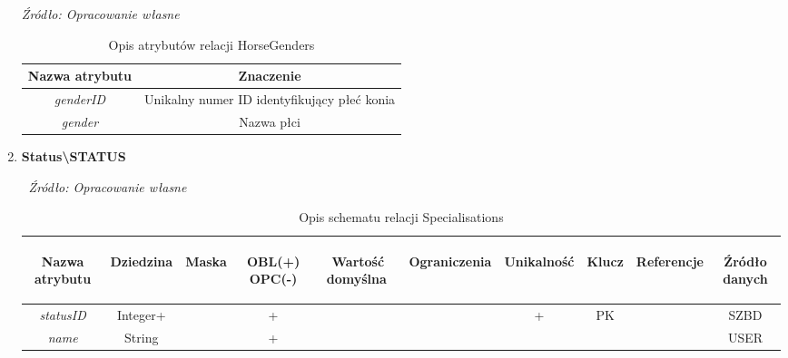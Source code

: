 \documentclass[12pt,oneside]{report}
\begin{document}
\begin{enumerate}[start=10,label={\bfseries REL\textbackslash\arabic*}]
	\begin{table}[H]
		\caption{Opis atrybutów relacji HorseGenders}
		\textit{Źródło: Opracowanie własne}
		\label{HorseGendersAttributeDescription}
		\centering
		\begin{tabular}{|c|c|}
			\hline
			Nazwa atrybutu & Znaczenie \\
			\hline
			\textit{genderID}& Unikalny numer ID identyfikujący płeć konia\\	
			\hline
			\textit{gender}& Nazwa płci\\
			\hline
		\end{tabular}
	\end{table}
	\item \textbf{Status\textbackslash STATUS} 
	\begin{table}[H]
		\caption{Opis schematu relacji Specialisations}
		$\ $
		\textit{Źródło: Opracowanie własne}
		\label{StatusRelationSchema}
		\centering
		\begin{tabular}{|c|c|c|c|c|c|c|c|c|c|}
			\hline
			\begin{sideways}Nazwa atrybutu\end{sideways}& 
			\begin{sideways}Dziedzina \end{sideways}& 
			\begin{sideways}Maska \end{sideways}& 
			\begin{sideways}OBL(+) OPC(-)\end{sideways} & 
			\begin{sideways}Wartość domyślna$\ $\end{sideways}& 
			\begin{sideways}Ograniczenia\end{sideways} &
			\begin{sideways}Unikalność \end{sideways}& 
			\begin{sideways}Klucz \end{sideways}& 
			\begin{sideways}Referencje \end{sideways}&
			\begin{sideways}Źródło danych\end{sideways}\\
			\hline
			\textit{statusID}&Integer+&&+&&&+&PK&&SZBD\\	
			\hline			
			\textit{name}&String&&+&&&&&&USER\\	
			\hline
		\end{tabular}
	\end{table}
	

\end{enumerate}
\end{document}
